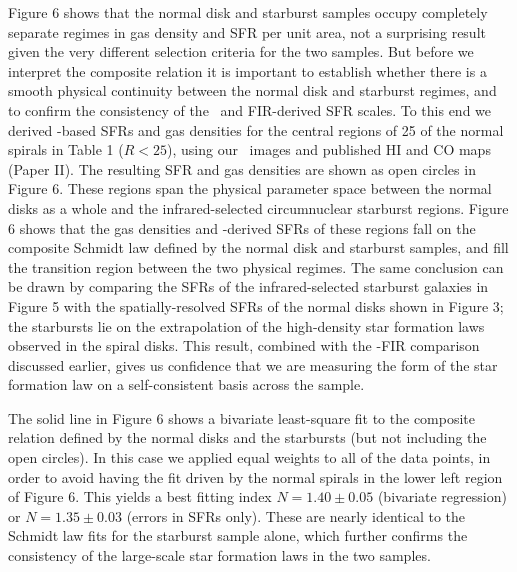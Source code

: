 Figure 6 shows that the normal disk and starburst samples occupy
completely separate regimes in gas density and SFR per unit area,
not a surprising result given the very different selection criteria
for the two samples.  But before we interpret the composite relation it is 
important to establish whether there is a smooth physical continuity between
the normal disk and starburst regimes, and to confirm the consistency 
of the \halpha\ and FIR-derived SFR scales.  To this end we derived 
\halpha-based SFRs and gas densities for the central regions of 
25 of the normal spirals in Table 1 ($R < 25$\arcsec), using our 
\halpha\ images and published HI and CO maps (Paper II).  The resulting
SFR and gas densities are shown as open circles in Figure 6.
These regions span the physical parameter space between the normal
disks as a whole and the infrared-selected circumnuclear starburst regions.
Figure 6 shows that the gas densities and \halpha-derived SFRs of these
regions fall on the composite Schmidt law defined by the normal disk
and starburst samples, and fill the transition region between the two
physical regimes.  The same conclusion can be drawn by comparing the
SFRs of the infrared-selected starburst galaxies in Figure 5 with the
spatially-resolved SFRs of the normal disks shown in Figure 3; the
starbursts lie on the extrapolation of the high-density star formation
laws observed in the spiral disks.  
This result, combined with the \brgamma-FIR comparison
discussed earlier, gives us confidence that we are
measuring the form of the star formation law on a self-consistent basis
across the sample.

The solid line in Figure 6 shows a bivariate least-square fit to the composite
relation defined by the normal disks and the starbursts (but not including
the open circles).  In this 
case we applied equal weights to all of the data points, in order to
avoid having the fit driven by the normal spirals in the lower left
region of Figure 6.  This yields a best fitting index $N = 1.40 \pm 0.05$
(bivariate regression) or $N = 1.35 \pm 0.03$ (errors in SFRs only).
These are nearly identical to the Schmidt law fits for the starburst
sample alone, which further confirms the consistency of the large-scale
star formation laws in the two samples.

